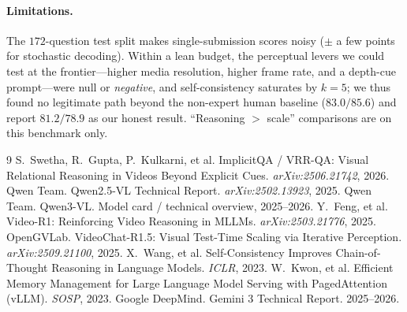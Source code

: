 \documentclass[10pt,twocolumn,letterpaper]{article}
\begin{document}
\paragraph{Limitations.} The $172$-question test split makes single-submission scores noisy
($\pm$ a few points for stochastic decoding). Within a lean budget, the perceptual levers we could test
at the frontier---higher media resolution, higher frame rate, and a depth-cue prompt---were null or
\emph{negative}, and self-consistency saturates by $k{=}5$; we thus found no legitimate path beyond the
non-expert human baseline ($83.0/85.6$) and report $81.2/78.9$ as our honest result.
``Reasoning $>$ scale'' comparisons are on this benchmark only.

{\small
\begin{thebibliography}{9}
 S.~Swetha, R.~Gupta, P.~Kulkarni, et al. ImplicitQA / VRR-QA: Visual Relational Reasoning in Videos Beyond Explicit Cues. \emph{arXiv:2506.21742}, 2026.
 Qwen Team. Qwen2.5-VL Technical Report. \emph{arXiv:2502.13923}, 2025.
 Qwen Team. Qwen3-VL. Model card / technical overview, 2025--2026.
 Y.~Feng, et al. Video-R1: Reinforcing Video Reasoning in MLLMs. \emph{arXiv:2503.21776}, 2025.
 OpenGVLab. VideoChat-R1.5: Visual Test-Time Scaling via Iterative Perception. \emph{arXiv:2509.21100}, 2025.
 X.~Wang, et al. Self-Consistency Improves Chain-of-Thought Reasoning in Language Models. \emph{ICLR}, 2023.
 W.~Kwon, et al. Efficient Memory Management for Large Language Model Serving with PagedAttention (vLLM). \emph{SOSP}, 2023.
 Google DeepMind. Gemini 3 Technical Report. 2025--2026.
\end{thebibliography}
}
\end{document}
